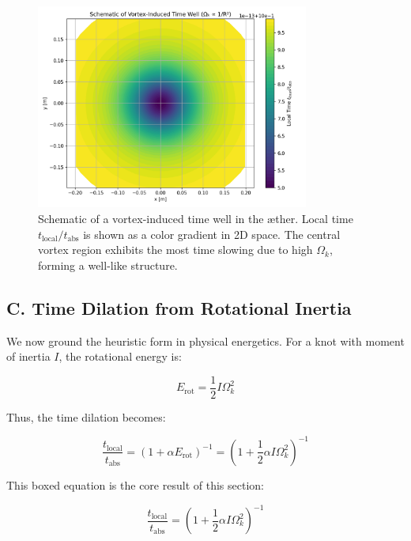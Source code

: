 \begin{figure}[h!]
    \centering
    \includegraphics[width=0.8\textwidth]{export/RadialProfileOfLocalTimeDilation_Vortex-Induced_Time_Well}
    \caption{Schematic of a vortex-induced time well in the æther. Local time $t_{\text{local}} / t_{\text{abs}}$ is shown as a color gradient in 2D space. The central vortex region exhibits the most time slowing due to high $\Omega_k$, forming a well-like structure.}
    \label{fig:vortex_time_well}
\end{figure}

\subsection*{C. Time Dilation from Rotational Inertia}

We now ground the heuristic form in physical energetics. For a knot with moment of inertia $I$, the rotational energy is:

\begin{equation}
E_{\text{rot}} = \frac{1}{2} I \Omega_k^2
\end{equation}

Thus, the time dilation becomes:

\begin{equation}
\frac{t_{\text{local}}}{t_{\text{abs}}} = \left(1 + \alpha E_{\text{rot}} \right)^{-1} = \left(1 + \frac{1}{2} \alpha I \Omega_k^2 \right)^{-1}
\end{equation}

This boxed equation is the core result of this section:

\begin{equation}
\boxed{\frac{t_{\text{local}}}{t_{\text{abs}}} = \left(1 + \frac{1}{2} \alpha I \Omega_k^2 \right)^{-1}}
\end{equation}

